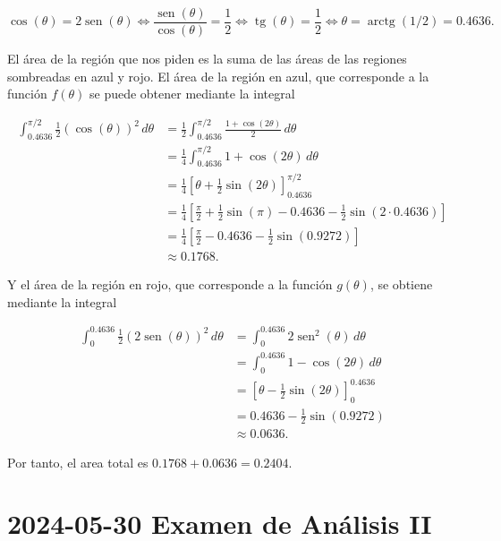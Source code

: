 \documentclass[
  spanish,
  a4paper,
]{scrreport}
\theoremstyle{definition}
\theoremstyle{remark}
\begin{document}
\begin{tcolorbox}
\[
\cos(\theta) = 2\operatorname{sen}(\theta)
\Leftrightarrow \frac{\operatorname{sen}(\theta)}{\cos(\theta)} = \frac{1}{2}
\Leftrightarrow \operatorname{tg}(\theta) = \frac{1}{2}
\Leftrightarrow \theta = \operatorname{arctg}(1/2) = 0.4636.
\]

El área de la región que nos piden es la suma de las áreas de las
regiones sombreadas en azul y rojo. El área de la región en azul, que
corresponde a la función \(f(\theta)\) se puede obtener mediante la
integral

\begin{align*}
\int_{0.4636}^{\pi/2} \frac{1}{2}(\cos(\theta))^2\, d\theta
&= \frac{1}{2} \int_{0.4636}^{\pi/2} \frac{1 + \cos(2\theta)}{2}\, d\theta \\
&= \frac{1}{4} \int_{0.4636}^{\pi/2} 1 + \cos(2\theta)\, d\theta \\
&= \frac{1}{4} \left[\theta + \frac{1}{2}\sin(2\theta)\right]_{0.4636}^{\pi/2} \\
&= \frac{1}{4} \left[\frac{\pi}{2} + \frac{1}{2}\sin(\pi) - 0.4636 - \frac{1}{2}\sin(2\cdot 0.4636)\right] \\
&= \frac{1}{4} \left[\frac{\pi}{2} - 0.4636 - \frac{1}{2}\sin(0.9272)\right] \\
&\approx 0.1768.
\end{align*}

Y el área de la región en rojo, que corresponde a la función
\(g(\theta)\), se obtiene mediante la integral

\begin{align*}
\int_{0}^{0.4636} \frac{1}{2}(2\operatorname{sen}(\theta))^2\, d\theta 
&= \int_{0}^{0.4636} 2\operatorname{sen}^2(\theta)\, d\theta \\
&= \int_{0}^{0.4636} 1 - \cos(2\theta)\, d\theta \\
&= \left[\theta - \frac{1}{2}\sin(2\theta)\right]_{0}^{0.4636} \\
&= 0.4636 - \frac{1}{2}\sin(0.9272) \\
&\approx 0.0636.
\end{align*}

Por tanto, el area total es \(0.1768 + 0.0636 = 0.2404\).

\end{tcolorbox}


\chapter{\texorpdfstring{2024-05-30 Examen de Análisis
II}{2024-05-30  Examen de Análisis II}}\label{examen-de-anuxe1lisis-ii-3}
\end{document}
